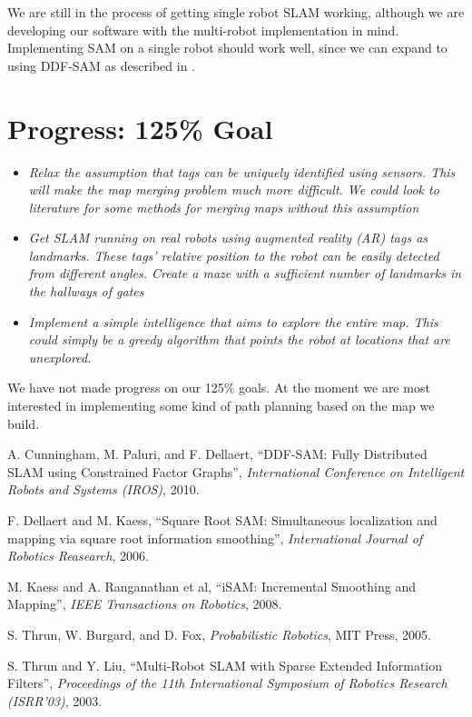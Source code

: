 \documentclass[11pt]{article}
\begin{document}
We are still in the process of getting single robot SLAM working, although we are developing our software with the multi-robot implementation in mind. Implementing SAM on a single robot should work well, since we can expand to using DDF-SAM as described in \cite{cunningham2010}.

\section{Progress: 125\% Goal}
\begin{itemize}
    \item \emph{Relax the assumption that tags can be uniquely identified using sensors. This will make the map merging problem much more difficult. We could look to literature for some methods for merging maps without this assumption}
    \item \emph{Get SLAM running on real robots using augmented reality (AR) tags as landmarks. These tags' relative position to the robot can be easily detected from different angles. Create a maze with a sufficient number of landmarks in the hallways of gates}
    \item \emph{Implement a simple intelligence that aims to explore the entire map. This could simply be a greedy algorithm that points the robot at locations that are unexplored.}
\end{itemize}

We have not made progress on our 125\% goals. At the moment we are most interested in implementing some kind of path planning based on the map we build.

\begin{thebibliography}{12}
        A. Cunningham, M. Paluri, and F. Dellaert, ``DDF-SAM: Fully Distributed SLAM using Constrained Factor Graphs'', \emph{International Conference on Intelligent Robots and Systems (IROS)}, 2010.

        F. Dellaert and M. Kaess, ``Square Root SAM: Simultaneous localization and mapping via square root information smoothing'', \emph{International Journal of Robotics Reasearch}, 2006.

        M. Kaess and A. Ranganathan et al, ``iSAM: Incremental Smoothing and Mapping'', \emph{IEEE Transactions on Robotics}, 2008.

        S. Thrun, W. Burgard, and D. Fox, \emph{Probabilistic Robotics}, MIT Press, 2005.

        S. Thrun and Y. Liu, ``Multi-Robot SLAM with Sparse Extended Information Filters'', \emph{Proceedings of the 11th International Symposium of Robotics Research (ISRR'03)}, 2003.

\end{thebibliography}
\end{document}
